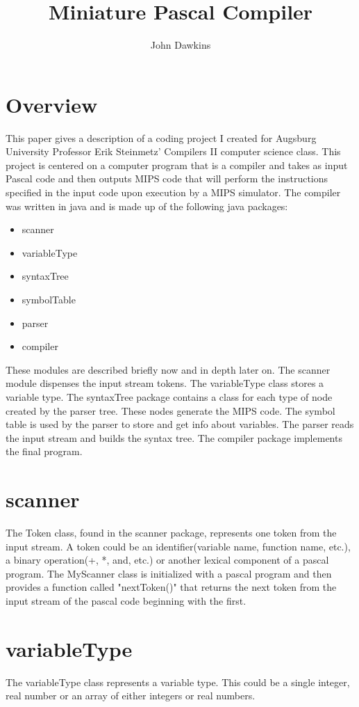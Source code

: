 \documentclass[12pt]{article}
\title{Miniature Pascal Compiler}
\author{John Dawkins}
\date{}
\begin{document}
	
	\maketitle

	\section*{Overview}
	This paper gives a description of a coding project I created for Augsburg University Professor Erik Steinmetz' Compilers II computer science class. This project is centered on a computer program that is a compiler and takes as input Pascal code and then outputs MIPS code that will perform the instructions specified in the input code upon execution by a MIPS simulator. The compiler was written in java and is made up of the following java packages:
	\begin{itemize}
		\item scanner
		\item variableType
		\item syntaxTree
		\item symbolTable
		\item parser
		\item compiler
	\end{itemize}
	These modules are described briefly now and in depth later on. The scanner module dispenses the input stream tokens. The variableType class stores a variable type. The syntaxTree package contains a class for each type of node created by the parser tree. These nodes generate the MIPS code. The symbol table is used by the parser to store and get info about variables. The parser reads the input stream and builds the syntax tree. The compiler package implements the final program.
	
	\section*{scanner}
	The Token class, found in the scanner package, represents one token from the input stream. A token could be an identifier(variable name, function name, etc.), a binary operation(+, *, and, etc.) or another lexical component of a pascal program. The MyScanner class is initialized with a pascal program and then provides a function called "nextToken()" that returns the next token from the input stream of the pascal code beginning with the first.
	
	\section*{variableType}
	The variableType class represents a variable type. This could be a single integer, real number or an array of either integers or real numbers.
	
\end{document}
